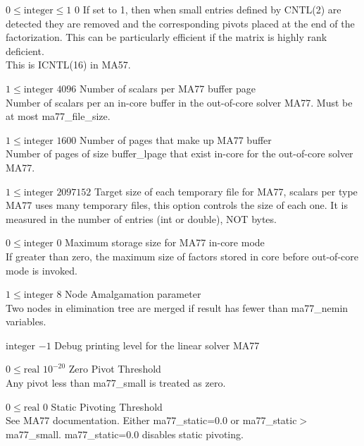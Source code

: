 %
{$0\leq\textrm{integer}\leq1$}%
{$0$}%
{If set to 1, then when small entries defined by CNTL(2) are detected they are removed and the corresponding pivots placed at the end of the factorization.  This can be particularly efficient if the matrix is highly rank deficient.\\
This is ICNTL(16) in MA57.}%
{}

%
{$1\leq\textrm{integer}$}%
{$4096$}%
{Number of scalars per MA77 buffer page\\
Number of scalars per an in-core buffer in the out-of-core solver MA77. Must be at most ma77\_file\_size.}%
{}

%
{$1\leq\textrm{integer}$}%
{$1600$}%
{Number of pages that make up MA77 buffer\\
Number of pages of size buffer\_lpage that exist in-core for the out-of-core solver MA77.}%
{}

%
{$1\leq\textrm{integer}$}%
{$2097152$}%
{Target size of each temporary file for MA77, scalars per type\\
MA77 uses many temporary files, this option controls the size of each one. It is measured in the number of entries (int or double), NOT bytes.}%
{}

%
{$0\leq\textrm{integer}$}%
{$0$}%
{Maximum storage size for MA77 in-core mode\\
If greater than zero, the maximum size of factors stored in core before out-of-core mode is invoked.}%
{}

%
{$1\leq\textrm{integer}$}%
{$8$}%
{Node Amalgamation parameter\\
Two nodes in elimination tree are merged if result has fewer than ma77\_nemin variables.}%
{}

%
{$\textrm{integer}$}%
{$-1$}%
{Debug printing level for the linear solver MA77}%
{}

%
{$0\leq\textrm{real}$}%
{$10^{-20}$}%
{Zero Pivot Threshold\\
Any pivot less than ma77\_small is treated as zero.}%
{}

%
{$0\leq\textrm{real}$}%
{$0$}%
{Static Pivoting Threshold\\
See MA77 documentation. Either ma77\_static=0.0 or ma77\_static$>$ma77\_small. ma77\_static=0.0 disables static pivoting.}%
{}

